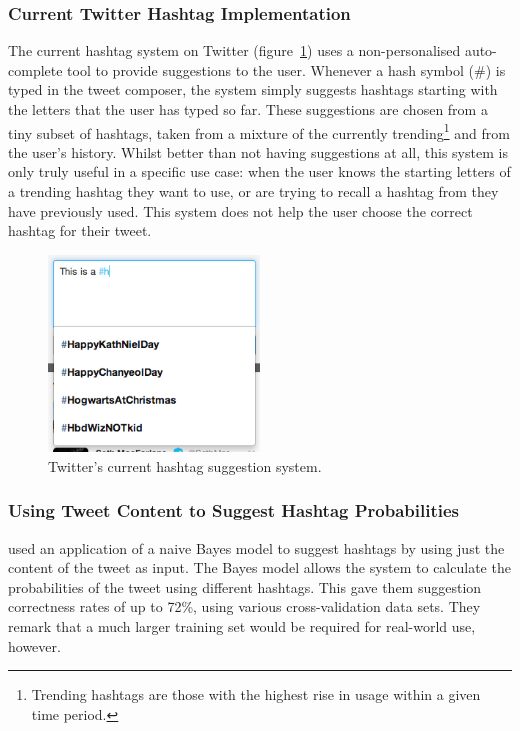 \documentclass[12pt,a4paper]{article}
\begin{document}
\subsubsection{Current Twitter Hashtag Implementation}
The current hashtag system on Twitter (figure~\ref{fig:twittersuggest}) uses a non-personalised auto-complete tool to provide suggestions to the user. Whenever a hash symbol (\#) is typed in the tweet composer, the system simply suggests hashtags starting with the letters that the user has typed so far. These suggestions are chosen from a tiny subset of hashtags, taken from a mixture of the currently trending\footnote{Trending hashtags are those with the highest rise in usage within a given time period.} and from the user's history. Whilst better than not having suggestions at all, this system is only truly useful in a specific use case: when the user knows the starting letters of a trending hashtag they want to use, or are trying to recall a hashtag from they have previously used. This system does not help the user choose the correct hashtag for their tweet.

\begin{figure}
    \centering
    \includegraphics[width=0.5\textwidth]{twittersuggest.png}
    \caption{Twitter's current hashtag suggestion system.\label{fig:twittersuggest}}
\end{figure}

\subsubsection{Using Tweet Content to Suggest Hashtag Probabilities}
\textcite{Mazzia:2011} used an application of a naive Bayes model to suggest hashtags by using just the content of the tweet as input. The Bayes model allows the system to calculate the probabilities of the tweet using different hashtags. This gave them suggestion correctness rates of up to 72\%, using various cross-validation data sets. They remark that a much larger training set would be required for real-world use, however.
\end{document}
